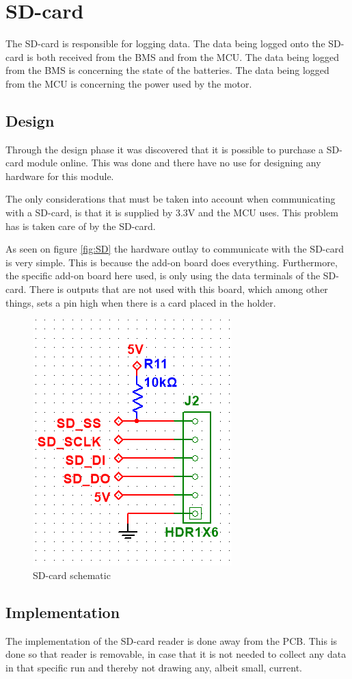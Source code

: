 \newpage
\section{SD-card}
The SD-card is responsible for logging data. The data being logged onto the SD-card is both received from the BMS and from the MCU. The data being logged from the BMS is concerning the state of the batteries. The data being logged from the MCU is concerning the power used by the motor.

\subsection{Design}
Through the design phase it was discovered that it is possible to purchase a SD-card module online. This was done and there have no use for designing any hardware for this module.

The only considerations that must be taken into account when communicating with a SD-card, is that it is supplied by 3.3V and the MCU uses. This problem has is taken care of by the SD-card.

As seen on figure \vref{fig:SD} the hardware outlay to communicate with the SD-card is very simple. This is because the add-on board does everything. Furthermore, the specific add-on board here used, is only using the data terminals of the SD-card. There is outputs that are not used with this board, which among other things, sets a pin high when there is a card placed in the holder. 

\begin{figure}[H]
	\centering
	\includegraphics[width=0.4\linewidth]{Hardware/Pictures/SD_card}
	\caption{SD-card schematic}
	\label{fig:SD}
\end{figure}

\newpage
\subsection{Implementation}
The implementation of the SD-card reader is done away from the PCB. This is done so that reader is removable, in case that it is not needed to collect any data in that specific run and thereby not drawing any, albeit small, current.  

